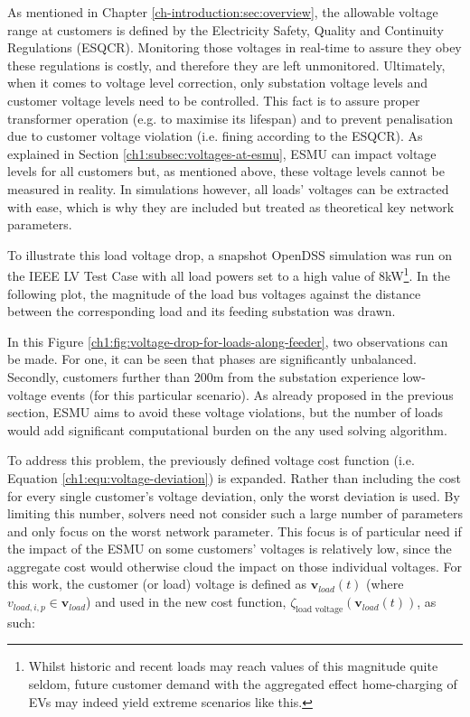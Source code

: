 As mentioned in Chapter \ref{ch-introduction:sec:overview}, the allowable voltage range at customers is defined by the Electricity Safety, Quality and Continuity Regulations (ESQCR).
Monitoring those voltages in real-time to assure they obey these regulations is costly, and therefore they are left unmonitored.
Ultimately, when it comes to voltage level correction, only substation voltage levels and customer voltage levels need to be controlled.
This fact is to assure proper transformer operation (e.g. to maximise its lifespan) and to prevent penalisation due to customer voltage violation (i.e. fining according to the ESQCR).
As explained in Section \ref{ch1:subsec:voltages-at-esmu}, ESMU can impact voltage levels for all customers but, as mentioned above, these voltage levels cannot be measured in reality.
In simulations however, all loads' voltages can be extracted with ease, which is why they are included but treated as theoretical key network parameters.

To illustrate this load voltage drop, a snapshot OpenDSS simulation was run on the IEEE LV Test Case with all load powers set to a high value of 8kW\footnote{Whilst historic and recent loads may reach values of this magnitude quite seldom, future customer demand with the aggregated effect home-charging of EVs may indeed yield extreme scenarios like this.}.
In the following plot, the magnitude of the load bus voltages against the distance between the corresponding load and its feeding substation was drawn.



In this Figure \ref{ch1:fig:voltage-drop-for-loads-along-feeder}, two observations can be made.
For one, it can be seen that phases are significantly unbalanced.
Secondly, customers further than 200m from the substation experience low-voltage events (for this particular scenario).
As already proposed in the previous section, ESMU aims to avoid these voltage violations, but the number of loads would add significant computational burden on the any used solving algorithm.

To address this problem, the previously defined voltage cost function (i.e. Equation \ref{ch1:equ:voltage-deviation}) is expanded.
Rather than including the cost for every single customer's voltage deviation, only the worst deviation is used.
By limiting this number, solvers need not consider such a large number of parameters and only focus on the worst network parameter.
This focus is of particular need if the impact of the ESMU on some customers' voltages is relatively low, since the aggregate cost would otherwise cloud the impact on those individual voltages.
For this work, the customer (or load) voltage is defined as $\textbf{v}_{load}(t)$ (where $v_{load,i,p} \in \textbf{v}_{load}$) and used in the new cost function, $\zeta_\text{load voltage}(\textbf{v}_{load}(t))$, as such:

